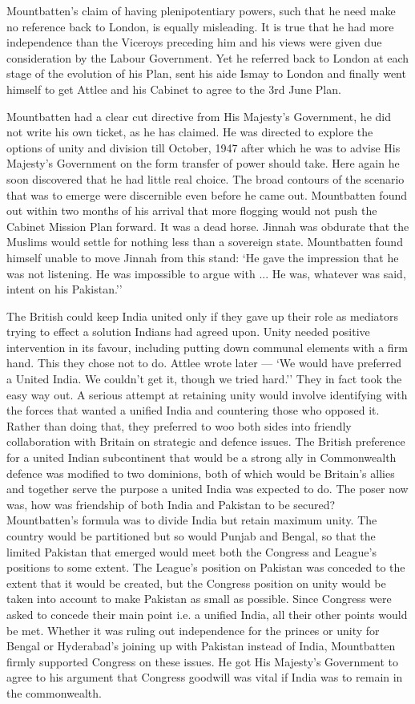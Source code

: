 Mountbatten's claim of having plenipotentiary powers, such that he need make no reference back to London, is equally misleading. It is true that he had more independence than the Viceroys preceding him and his views were given due consideration by the Labour Government. Yet he referred back to London at each stage of the evolution of his Plan, sent his aide Ismay to London and finally went himself to get Attlee and his Cabinet to agree to the 3rd June Plan. 

Mountbatten had a clear cut directive from His Majesty's Government, he did not write his own ticket, as he has claimed. He was directed to explore the options of unity and division till October, 1947 after which he was to advise His Majesty's Government on the form transfer of power should take. Here again he soon discovered that he had little real choice. The broad contours of the scenario that was to emerge were discernible even before he came out. Mountbatten found out within two months of his arrival that more flogging would not push the Cabinet Mission Plan forward. It was a dead horse. Jinnah was obdurate that the Muslims would settle for nothing less than a sovereign state. Mountbatten found himself unable to move Jinnah from this stand: `He gave the impression that he was not listening. He was impossible to argue with ... He was, whatever was said, intent on his Pakistan.'' 

The British could keep India united only if they gave up their role as mediators trying to effect a solution Indians had agreed upon. Unity needed positive intervention in its favour, including putting down communal elements with a firm hand. This they chose not to do. Attlee wrote later --- `We would have preferred a United India. We couldn't get it, though we tried hard.'' They in fact took the easy way out. A serious attempt at retaining unity would involve identifying with the forces that wanted a unified India and countering those who opposed it. Rather than doing that, they preferred to woo both sides into friendly collaboration with Britain on strategic and defence issues. The British preference for a united Indian subcontinent that would be a strong ally in Commonwealth defence was modified to two dominions, both of which would be Britain's allies and together serve the purpose a united India was expected to do. The poser now was, how was friendship of both India and Pakistan to be secured? Mountbatten's formula was to divide India but retain maximum unity. The country would be partitioned but so would Punjab and Bengal, so that the limited Pakistan that emerged would meet both the Congress and League's positions to some extent. The League's position on Pakistan was conceded to the extent that it would be created, but the Congress position on unity would be taken into account to make Pakistan as small as possible. Since Congress were asked to concede their main point i.e. a unified India, all their other points would be met. Whether it was ruling out independence for the princes or unity for Bengal or Hyderabad's joining up with Pakistan instead of India, Mountbatten firmly supported Congress on these issues. He got His Majesty's Government to agree to his argument that Congress goodwill was vital if India was to remain in the commonwealth. 


